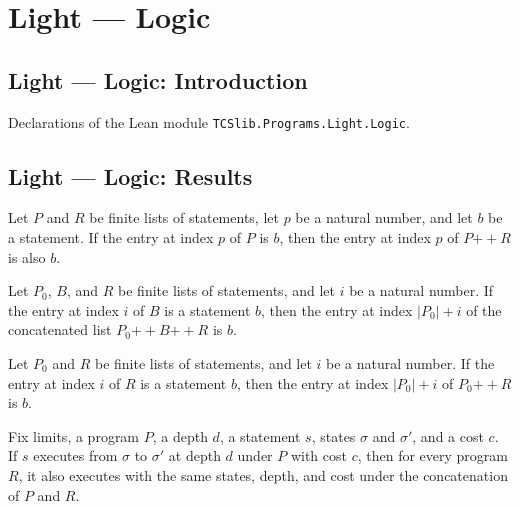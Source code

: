 \section{Light --- Logic}
\subsection*{Light --- Logic: Introduction}

Declarations of the Lean module \texttt{TCSlib.Programs.Light.Logic}.

\subsection*{Light --- Logic: Results}

\begin{theorem}
\leanok
{}
Let $P$ and $R$ be finite lists of statements, let $p$ be a natural number, and let $b$
be a statement. If the entry at index $p$ of $P$ is $b$, then the entry at index $p$ of
$P\mathbin{++}R$ is also $b$.
\end{theorem}

\begin{theorem}
\leanok
{}
Let $P_0$, $B$, and $R$ be finite lists of statements, and let $i$ be a natural number.
If the entry at index $i$ of $B$ is a statement $b$, then the entry at index $|P_0|+i$
of the concatenated list $P_0\mathbin{++}B\mathbin{++}R$ is $b$.
\end{theorem}

\begin{theorem}
\leanok
{}
Let $P_0$ and $R$ be finite lists of statements, and let $i$ be a natural number. If the
entry at index $i$ of $R$ is a statement $b$, then the entry at index $|P_0|+i$ of
$P_0\mathbin{++}R$ is $b$.
\end{theorem}

\begin{theorem}
\label{Light.Exec.append}
\leanok
{}
Fix limits, a program $P$, a depth $d$, a statement $s$, states $\sigma$ and $\sigma'$,
and a cost $c$. If $s$ executes from $\sigma$ to $\sigma'$ at depth $d$ under $P$ with
cost $c$, then for every program $R$, it also executes with the same states, depth, and
cost under the concatenation of $P$ and $R$.
\end{theorem}

